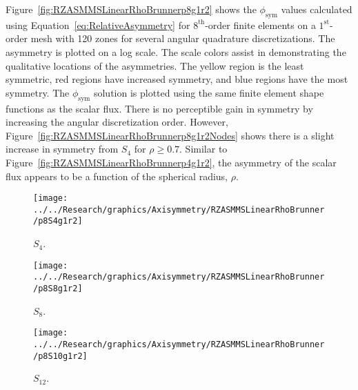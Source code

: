 \documentclass[12pt]{article}
\begin{document}
\FloatBarrier

Figure~\ref{fig:RZASMMSLinearRhoBrunnerp8g1r2} shows the $\phi_\text{sym}$ values calculated using Equation~\ref{eq:RelativeAsymmetry} for $8^\text{th}$-order finite elements on a $1^\text{st}$-order mesh with 120 zones for several angular quadrature discretizations. The asymmetry is plotted on a log scale. The scale colors assist in demonstrating the qualitative locations of the asymmetries. The yellow region is the least symmetric, red regions have increased symmetry, and blue regions have the most symmetry. The $\phi_\text{sym}$ solution is plotted using the same finite element shape functions as the scalar flux. There is no perceptible gain in symmetry by increasing the angular discretization order. However, Figure~\ref{fig:RZASMMSLinearRhoBrunnerp8g1r2Nodes} shows there is a slight increase in symmetry from $S_4$ for $\rho \geq 0.7$. Similar to Figure~\ref{fig:RZASMMSLinearRhoBrunnerp4g1r2}, the asymmetry of the scalar flux appears to be a function of the spherical radius, $\rho$.

\begin{sidewaysfigure}[!htb]
\centering
\begin{subfigure}{0.33\textwidth}
\texttt{[image: ../../Research/graphics/Axisymmetry/RZASMMSLinearRhoBrunner/p8S4g1r2]}
\caption{$S_4$.}
\end{subfigure}%
\begin{subfigure}{0.33\textwidth}
\texttt{[image: ../../Research/graphics/Axisymmetry/RZASMMSLinearRhoBrunner/p8S8g1r2]}
\caption{$S_8$.}
\end{subfigure}%
\begin{subfigure}{0.33\textwidth}
\texttt{[image: ../../Research/graphics/Axisymmetry/RZASMMSLinearRhoBrunner/p8S10g1r2]}
\caption{$S_{12}$.}
\end{subfigure}
\caption{Relative asymmetry for $8^\text{st}$-order finite elements on a $1^\text{st}$-order mesh for given order of level-symmetric angular quadrature.}
\label{fig:RZASMMSLinearRhoBrunnerp8g1r2}
\end{sidewaysfigure}
\end{document}
